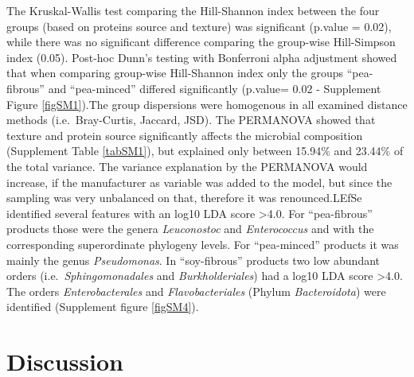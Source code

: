 \documentclass[preprint,3p,
a4paper]{elsarticle} %
\begin{document}
The Kruskal-Wallis test comparing the Hill-Shannon index between the
four groups (based on proteins source and texture) was significant
(p.value = 0.02), while there was no significant difference comparing
the group-wise Hill-Simpson index (0.05). Post-hoc Dunn's testing with
Bonferroni alpha adjustment showed that when comparing group-wise
Hill-Shannon index only the groups ``pea-fibrous'' and ``pea-minced''
differed significantly (p.value= 0.02 - Supplement Figure
\ref{figSM1}).\newline  The group dispersions were homogenous in all
examined distance methods (i.e.~Bray-Curtis, Jaccard, JSD). The
PERMANOVA showed that texture and protein source significantly affects
the microbial composition (Supplement Table \ref{tabSM1}), but explained
only between 15.94\% and 23.44\% of the total variance. The variance
explanation by the PERMANOVA would increase, if the manufacturer as
variable was added to the model, but since the sampling was very
unbalanced on that, therefore it was renounced.\newline LEfSe identified
several features with an log10 LDA score \textgreater4.0. For
``pea-fibrous'' products those were the genera \emph{Leuconostoc} and
\emph{Enterococcus} and with the corresponding superordinate phylogeny
levels. For ``pea-minced'' products it was mainly the genus
\emph{Pseudomonas}. In ``soy-fibrous'' products two low abundant orders
(i.e.~\emph{Sphingomonadales} and \emph{Burkholderiales}) had a log10
LDA score \textgreater4.0. The orders \emph{Enterobacterales} and
\emph{Flavobacteriales} (Phylum \emph{Bacteroidota}) were identified
(Supplement figure \ref{figSM4}).

\hypertarget{discussion}{%
\section{Discussion}\label{discussion}}
\end{document}
